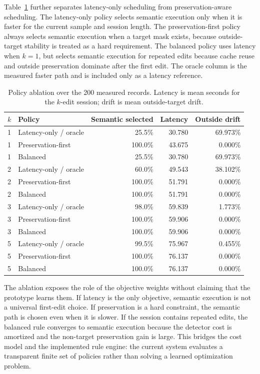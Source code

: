 \documentclass[final,5p,times,number,sort&compress]{elsarticle}
\begin{document}
Table~\ref{tab:policy-ablation} further separates latency-only scheduling from preservation-aware scheduling. The latency-only policy selects semantic execution only when it is faster for the current sample and session length. The preservation-first policy always selects semantic execution when a target mask exists, because outside-target stability is treated as a hard requirement. The balanced policy uses latency when \(k=1\), but selects semantic execution for repeated edits because cache reuse and outside preservation dominate after the first edit. The oracle column is the measured faster path and is included only as a latency reference.

\begin{table}[t]
\centering
\scriptsize
\caption{Policy ablation over the 200 measured records. Latency is mean seconds for the \(k\)-edit session; drift is mean outside-target drift.}
\label{tab:policy-ablation}
\begin{tabular}{llrrr}
\toprule
\(k\) & Policy & Semantic selected & Latency & Outside drift \\
\midrule
1 & Latency-only / oracle & 25.5\% & 30.780 & 69.973\% \\
1 & Preservation-first & 100.0\% & 43.675 & 0.000\% \\
1 & Balanced & 25.5\% & 30.780 & 69.973\% \\
2 & Latency-only / oracle & 60.0\% & 49.543 & 38.102\% \\
2 & Preservation-first & 100.0\% & 51.791 & 0.000\% \\
2 & Balanced & 100.0\% & 51.791 & 0.000\% \\
3 & Latency-only / oracle & 98.0\% & 59.839 & 1.773\% \\
3 & Preservation-first & 100.0\% & 59.906 & 0.000\% \\
3 & Balanced & 100.0\% & 59.906 & 0.000\% \\
5 & Latency-only / oracle & 99.5\% & 75.967 & 0.455\% \\
5 & Preservation-first & 100.0\% & 76.137 & 0.000\% \\
5 & Balanced & 100.0\% & 76.137 & 0.000\% \\
\bottomrule
\end{tabular}
\end{table}

The ablation exposes the role of the objective weights without claiming that the prototype learns them. If latency is the only objective, semantic execution is not a universal first-edit choice. If preservation is a hard constraint, the semantic path is chosen even when it is slower. If the session contains repeated edits, the balanced rule converges to semantic execution because the detector cost is amortized and the non-target preservation gain is large. This bridges the cost model and the implemented rule engine: the current system evaluates a transparent finite set of policies rather than solving a learned optimization problem.
\end{document}
